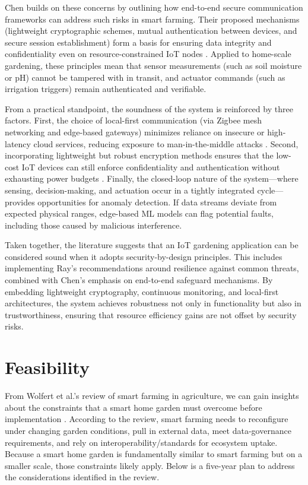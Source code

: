 \documentclass{sigchi}
\begin{document}
Chen builds on these concerns by outlining how end-to-end secure communication frameworks can address such risks in smart farming. Their proposed mechanisms (lightweight cryptographic schemes, mutual authentication between devices, and secure session establishment) form a basis for ensuring data integrity and confidentiality even on resource-constrained IoT nodes \cite{chen2021end}. Applied to home-scale gardening, these principles mean that sensor measurements (such as soil moisture or pH) cannot be tampered with in transit, and actuator commands (such as irrigation triggers) remain authenticated and verifiable.

From a practical standpoint, the soundness of the system is reinforced by three factors. First, the choice of local-first communication (via Zigbee mesh networking and edge-based gateways) minimizes reliance on insecure or high-latency cloud services, reducing exposure to man-in-the-middle attacks \cite{ray2020security}. Second, incorporating lightweight but robust encryption methods ensures that the low-cost IoT devices can still enforce confidentiality and authentication without exhausting power budgets \cite{chen2021end}. Finally, the closed-loop nature of the system—where sensing, decision-making, and actuation occur in a tightly integrated cycle—provides opportunities for anomaly detection. If data streams deviate from expected physical ranges, edge-based ML models can flag potential faults, including those caused by malicious interference.

Taken together, the literature suggests that an IoT gardening application can be considered sound when it adopts security-by-design principles. This includes implementing Ray’s recommendations around resilience against common threats, combined with Chen’s emphasis on end-to-end safeguard mechanisms. By embedding lightweight cryptography, continuous monitoring, and local-first architectures, the system achieves robustness not only in functionality but also in trustworthiness, ensuring that resource efficiency gains are not offset by security risks.

\section{Feasibility}

From Wolfert et al.’s review of smart farming in agriculture, we can gain insights about the constraints that a smart home garden must overcome before implementation \cite{wolfert2017big}. According to the review, smart farming needs to reconfigure under changing garden conditions, pull in external data, meet data-governance requirements, and rely on interoperability/standards for ecosystem uptake. Because a smart home garden is fundamentally similar to smart farming but on a smaller scale, those constraints likely apply. Below is a five-year plan to address the considerations identified in the review.
\end{document}
